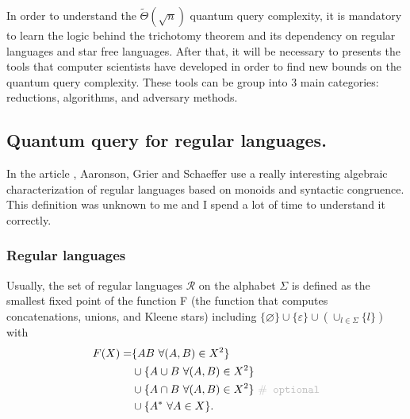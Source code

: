 In order to understand the $\tilde{\Theta}(\sqrt{n})$ quantum
query complexity, it is mandatory to learn the logic behind the
trichotomy theorem \cite{trichotomy_not_andris} and its dependency on regular
languages and star free languages.
After that, it will be necessary to presents the tools
that computer scientists have developed in order to
find new bounds on the quantum query complexity.
These tools can be group into 3 main categories:
reductions, algorithms, and adversary methods\cite{adversary_equivalence}.

\subsection{Quantum query for regular languages.}

In the article \cite{trichotomy_not_andris}, Aaronson, Grier and Schaeffer use
a really interesting algebraic characterization of regular languages based on
monoids and syntactic congruence. This definition was unknown to me and I spend
a lot of time to understand it correctly.

\subsubsection{Regular languages}

Usually, the set of regular languages $\mathcal{R}$ on the alphabet $\Sigma$ is
defined as the smallest fixed point of the function F (the function that computes
concatenations, unions, and Kleene stars) including $\{\varnothing\} \cup
    \{\varepsilon\} \cup(\cup_{l\in\Sigma}\{l\})$ with
\begin{align*}\label{eq:F}
    F(X) = & \{AB\  \forall (A,B)\in X^2\}                                                   \\
           & \cup \{A\cup B\ \forall (A,B) \in X^2 \}                                        \\
           & \cup \{A\cap B\ \forall (A,B) \in X^2 \}\ \texttt{\color{gray!50}$\#$ optional} \\
           & \cup \{A^*\ \forall A \in X \}.
\end{align*}


